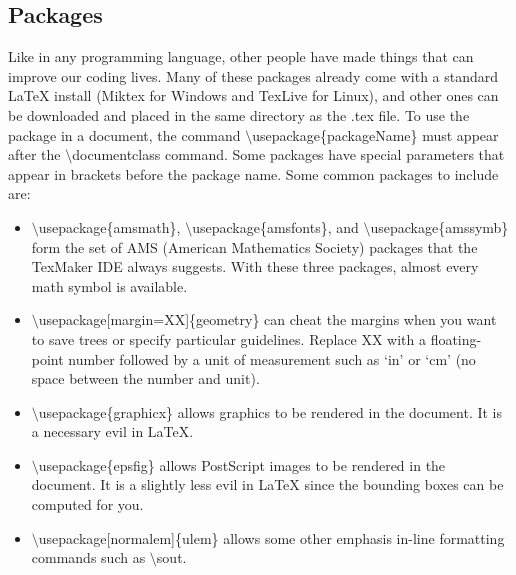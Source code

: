 \documentclass[10pt]{article}
\begin{document}
\subsection{Packages\label{packages}}
Like in any programming language, other people have made things that can improve our coding lives.  Many of these packages already come with a standard LaTeX install (Miktex for Windows and TexLive for Linux), and other ones can be downloaded and placed in the same directory as the .tex file.  To use the package in a document, the command $ \setminus $usepackage\{packageName\} must appear after the $ \setminus $documentclass command.  Some packages have special parameters that appear in brackets before the package name.  Some common packages to include are:
\begin{itemize}
\item $ \setminus $usepackage\{amsmath\}, $ \setminus $usepackage\{amsfonts\}, and $ \setminus $usepackage\{amssymb\} form the set of AMS (American Mathematics Society) packages that the TexMaker IDE always suggests.  With these three packages, almost every math symbol is available.
\item $ \setminus $usepackage[margin=XX]\{geometry\} can cheat the margins when you want to save trees or specify particular guidelines.  Replace XX with a floating-point number followed by a unit of measurement such as `in' or `cm' (no space between the number and unit).
\item $ \setminus $usepackage\{graphicx\} allows graphics to be rendered in the document.  It is a necessary evil in LaTeX.
\item $ \setminus $usepackage\{epsfig\} allows PostScript images to be rendered in the document.  It is a slightly less evil in LaTeX since the bounding boxes can be computed for you.
\item $ \setminus $usepackage[normalem]\{ulem\} allows some other emphasis in-line formatting commands such as $ \setminus $sout.
\end{itemize}
\end{document}
